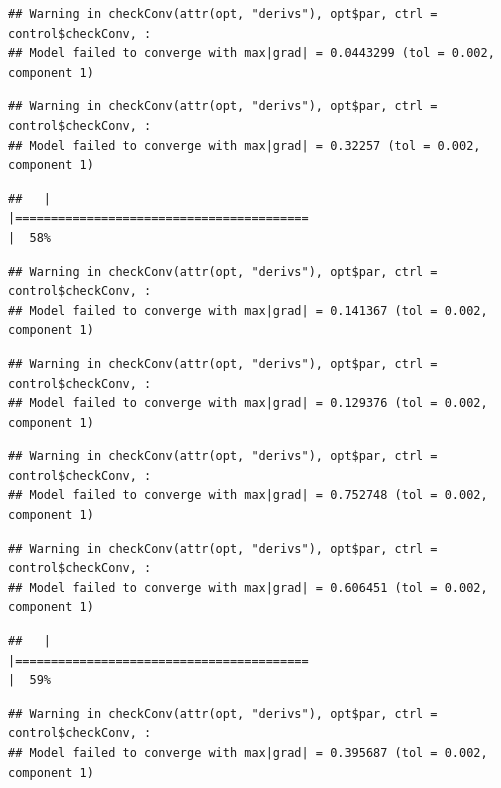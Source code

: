 \documentclass[
  12pt,
]{book}
\begin{document}
\begin{verbatim}
## Warning in checkConv(attr(opt, "derivs"), opt$par, ctrl = control$checkConv, :
## Model failed to converge with max|grad| = 0.0443299 (tol = 0.002, component 1)
\end{verbatim}

\begin{verbatim}
## Warning in checkConv(attr(opt, "derivs"), opt$par, ctrl = control$checkConv, :
## Model failed to converge with max|grad| = 0.32257 (tol = 0.002, component 1)
\end{verbatim}

\begin{verbatim}
##   |                                                                              |=========================================                             |  58%
\end{verbatim}

\begin{verbatim}
## Warning in checkConv(attr(opt, "derivs"), opt$par, ctrl = control$checkConv, :
## Model failed to converge with max|grad| = 0.141367 (tol = 0.002, component 1)
\end{verbatim}

\begin{verbatim}
## Warning in checkConv(attr(opt, "derivs"), opt$par, ctrl = control$checkConv, :
## Model failed to converge with max|grad| = 0.129376 (tol = 0.002, component 1)
\end{verbatim}

\begin{verbatim}
## Warning in checkConv(attr(opt, "derivs"), opt$par, ctrl = control$checkConv, :
## Model failed to converge with max|grad| = 0.752748 (tol = 0.002, component 1)
\end{verbatim}

\begin{verbatim}
## Warning in checkConv(attr(opt, "derivs"), opt$par, ctrl = control$checkConv, :
## Model failed to converge with max|grad| = 0.606451 (tol = 0.002, component 1)
\end{verbatim}

\begin{verbatim}
##   |                                                                              |=========================================                             |  59%
\end{verbatim}

\begin{verbatim}
## Warning in checkConv(attr(opt, "derivs"), opt$par, ctrl = control$checkConv, :
## Model failed to converge with max|grad| = 0.395687 (tol = 0.002, component 1)
\end{verbatim}
\end{document}
